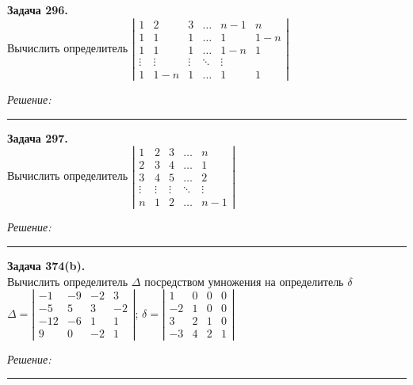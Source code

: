\documentclass[a4paper, 12pt]{article}
\newenvironment{problem}[2][Задача]
    { \begin{mdframed}[backgroundcolor=gray!10] \textbf{#1 #2.} \\}
    {  \end{mdframed}}
\newenvironment{solution}
    {\textit{Решение: }}
    {\noindent\rule{7in}{1.5pt}}
\begin{document}
\begin{problem}{296}
Вычислить определитель 
$\left| \begin{array}{cccccc}1 & 2 & 3 & \ldots & n-1 & n \\ 1 & 1 & 1 & \ldots & 1 & 1-n\\ 1 & 1 & 1 & \ldots & 1-n & 1 \\ \vdots & \vdots & \vdots & \ddots & \vdots \\ 1 & 1-n & 1 & \ldots & 1 & 1 \end{array} \right|$
\end{problem}
\begin{solution}



\end{solution} 

\begin{problem}{297}
Вычислить определитель 
$\left| \begin{array}{ccccc}1 & 2 & 3 & \ldots & n \\ 2 & 3 & 4 & \ldots & 1 \\ 3 & 4 & 5 & \ldots & 2 \\ \vdots & \vdots & \vdots & \ddots & \vdots \\ n & 1 & 2 & \ldots & n-1 \end{array} \right|$
\end{problem}
\begin{solution}



\end{solution} 

\begin{problem}{374(b)}
Вычислить определитель $\Delta$ посредством умножения на определитель $\delta$\\
$\Delta=\left| \begin{array}{rrrr} -1 & -9 & -2 & 3\\ -5 & 5 & 3 & -2\\ -12 & -6 & 1 & 1 \\ 9 & 0 & -2 & 1\end{array}\right|$;
$\delta=\left| \begin{array}{rrrr} 1 & 0 & 0 & 0\\ -2 & 1 & 0 & 0\\ 3 & 2 & 1 & 0 \\ -3 & 4 & 2 & 1\end{array}\right|$
\end{problem}
\begin{solution}



\end{solution} 
\end{document}
